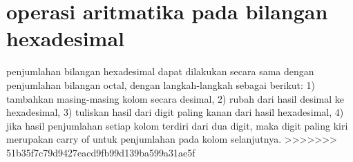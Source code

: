 \section{operasi aritmatika pada bilangan hexadesimal}
penjumlahan bilangan hexadesimal dapat dilakukan secara sama dengan penjumlahan bilangan octal, dengan langkah-langkah sebagai berikut: 1) tambahkan masing-masing kolom secara desimal, 2) rubah dari hasil desimal ke hexadesimal, 3) tuliskan hasil dari digit paling kanan dari hasil hexadesimal, 4) jika hasil penjumlahan setiap kolom terdiri dari dua digit, maka digit paling kiri merupakan carry of untuk penjumlahan pada kolom selanjutnya.
>>>>>>> 51b35f7c79d9427eacd9fb99d139ba599a31ae5f